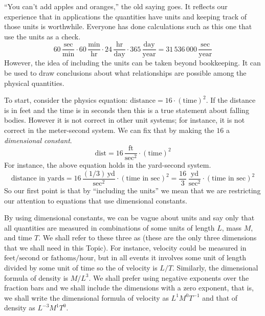 ``You can't add apples and oranges,'' the old saying goes.
It reflects our experience that in applications the quantities
have units and keeping track of those units is worthwhile.
Everyone has done calculations such as this one 
that use the units as a check.
\begin{equation*}
  60\,\frac{\text{sec}}{\text{min}}
  \cdot 60\,\frac{\text{min}}{\text{hr}}
  \cdot 24\,\frac{\text{hr}}{\text{day}}
  \cdot 365\,\frac{\text{day}}{\text{year}}
  = 31\,536\,000\,\frac{\text{sec}}{\text{year}}
\end{equation*}
However, the idea of including the units can be taken beyond bookkeeping.
It can be used to draw conclusions
about what relationships are possible among the physical quantities.

To start, consider the physics equation:
$\text{distance}=16\cdot(\text{time})^2$.
If the distance is in feet and the time is in seconds then this is a 
true statement about falling bodies.
However it is not correct in other unit systems; 
for instance, it is not correct in
the meter-second system.
We can fix that by making the $16$ a \emph{dimensional constant}.
\begin{equation*}
  \text{dist}=16\,\frac{\text{ft}}{\text{sec}^2}\cdot (\text{time})^2
\end{equation*}  
For instance, the above equation holds in the yard-second system.   
\begin{equation*}
  \text{distance in yards}=16\,\frac{(1/3)\,\text{yd}}{\text{sec}^2}
                    \cdot (\text{time in sec})^2
                   =\frac{16}{3}\,\frac{\text{yd}}{\text{sec}^2}
                    \cdot (\text{time in sec})^2
\end{equation*}
So our first point is that
by ``including the units'' we mean that we are restricting our attention
to equations that use dimensional constants. 

By using dimensional constants,
we can be vague about units   
and say only that all quantities are measured in combinations
of some units of length $L$, mass $M$, and time $T$.
We shall refer to these three
as 
(these are the only three
dimensions that we shall need in this Topic).
For instance, velocity 
could be measured in $\text{feet}/\text{second}$
or $\text{fathoms}/\text{hour}$, but in all events it involves
some unit of length divided by some unit of time
so the  of velocity is $L/T$.
Similarly, the dimensional formula of density is $M/L^3$.
We shall prefer using negative exponents over  
the fraction bars and we shall include the dimensions with a
zero exponent, that is, we shall write the dimensional formula of
velocity as $L^1M^0T^{-1}$ and that of density
as $L^{-3}M^1T^0$.

